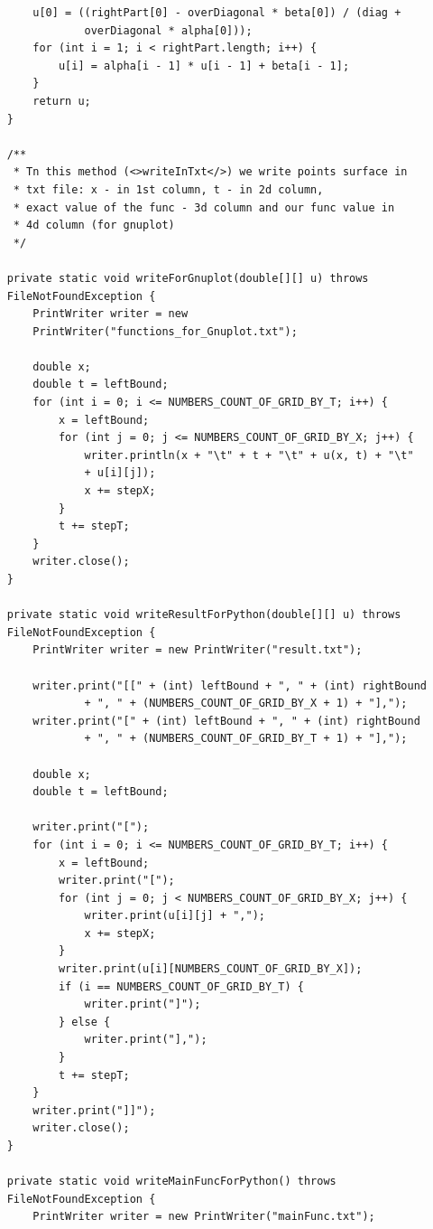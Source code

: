 \documentclass[12pt,a4paper]{scrartcl}
\begin{document}
\begin{verbatim}
        u[0] = ((rightPart[0] - overDiagonal * beta[0]) / (diag +
                overDiagonal * alpha[0]));
        for (int i = 1; i < rightPart.length; i++) {
            u[i] = alpha[i - 1] * u[i - 1] + beta[i - 1];
        }
        return u;
    }

    /**
     * Tn this method (<>writeInTxt</>) we write points surface in 
     * txt file: x - in 1st column, t - in 2d column,
     * exact value of the func - 3d column and our func value in 
     * 4d column (for gnuplot)
     */

    private static void writeForGnuplot(double[][] u) throws
    FileNotFoundException {
        PrintWriter writer = new
        PrintWriter("functions_for_Gnuplot.txt");

        double x;
        double t = leftBound;
        for (int i = 0; i <= NUMBERS_COUNT_OF_GRID_BY_T; i++) {
            x = leftBound;
            for (int j = 0; j <= NUMBERS_COUNT_OF_GRID_BY_X; j++) {
                writer.println(x + "\t" + t + "\t" + u(x, t) + "\t" 
                + u[i][j]);
                x += stepX;
            }
            t += stepT;
        }
        writer.close();
    }

    private static void writeResultForPython(double[][] u) throws
    FileNotFoundException {
        PrintWriter writer = new PrintWriter("result.txt");

        writer.print("[[" + (int) leftBound + ", " + (int) rightBound
                + ", " + (NUMBERS_COUNT_OF_GRID_BY_X + 1) + "],");
        writer.print("[" + (int) leftBound + ", " + (int) rightBound
                + ", " + (NUMBERS_COUNT_OF_GRID_BY_T + 1) + "],");

        double x;
        double t = leftBound;

        writer.print("[");
        for (int i = 0; i <= NUMBERS_COUNT_OF_GRID_BY_T; i++) {
            x = leftBound;
            writer.print("[");
            for (int j = 0; j < NUMBERS_COUNT_OF_GRID_BY_X; j++) {
                writer.print(u[i][j] + ",");
                x += stepX;
            }
            writer.print(u[i][NUMBERS_COUNT_OF_GRID_BY_X]);
            if (i == NUMBERS_COUNT_OF_GRID_BY_T) {
                writer.print("]");
            } else {
                writer.print("],");
            }
            t += stepT;
        }
        writer.print("]]");
        writer.close();
    }

    private static void writeMainFuncForPython() throws
    FileNotFoundException {
        PrintWriter writer = new PrintWriter("mainFunc.txt");


\end{verbatim}
\end{document}
